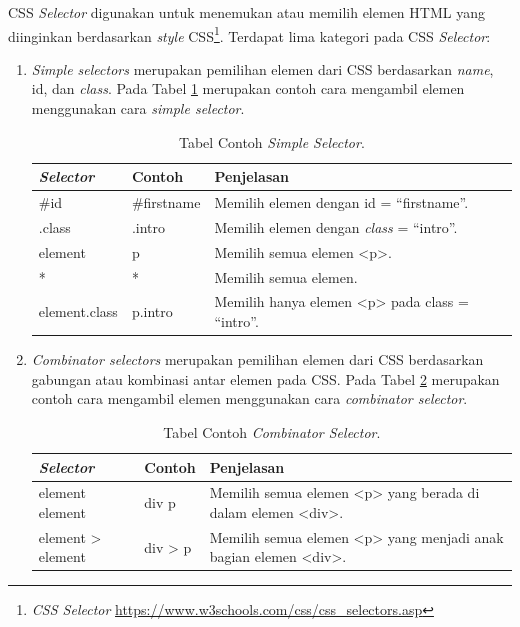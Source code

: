 CSS \textit{Selector} digunakan untuk menemukan atau memilih elemen HTML yang diinginkan berdasarkan \textit{style} CSS\footnote{\textit{CSS Selector} \url{https://www.w3schools.com/css/css_selectors.asp}}. Terdapat lima kategori pada CSS \textit{Selector}:
\begin{enumerate}
	
	\item \textit{Simple selectors} merupakan pemilihan elemen dari CSS berdasarkan \textit{name}, id, dan \textit{class}. Pada Tabel \ref{table:simpel} merupakan contoh cara mengambil elemen menggunakan cara \textit{simple selector}.
	\begin{table}[h!]	\vspace{-0.9cm}
		\centering
		\caption{Tabel Contoh \textit{Simple Selector}.}
		\label{table:simpel}
		\begin{tabular}{ | m{8em} | m{3cm}| m{8cm} | } 
			\hline
			\textit{\textbf{Selector}}& Contoh & Penjelasan \\ 
			\hline
			\#id & 	\#firstname & Memilih elemen dengan id = ``firstname''. \\ 
			\hline
			.class & .intro & Memilih elemen dengan \textit{class} = ``intro''. \\ 
			\hline
			element & p & Memilih semua elemen <p>. \\ 
			\hline
			* & * & Memilih semua elemen.  \\ 
			\hline
			element.class & p.intro & Memilih hanya elemen <p> pada class = ``intro''.  \\ 
			\hline
		\end{tabular}
	\end{table}
	\item \textit{Combinator selectors} merupakan pemilihan elemen dari CSS berdasarkan gabungan atau kombinasi antar elemen pada CSS. Pada Tabel \ref{table:combinator} merupakan contoh cara mengambil elemen menggunakan cara \textit{combinator selector}.
	\begin{table}[h!]	\vspace{-0.4cm}
		\centering
		\caption{Tabel Contoh \textit{Combinator Selector}.}
		\label{table:combinator}
		\begin{tabular}{ | m{9em} | m{2cm}| m{8cm} | } 
			\hline
			\textit{\textbf{Selector}}& Contoh & Penjelasan \\ 
			\hline
			element element & div p & Memilih semua elemen <p> yang berada di dalam elemen <div>. \\ 
			\hline
			element > element & div > p & Memilih semua elemen <p> yang menjadi anak bagian elemen <div>. \\ 

\end{tabular}
\end{table}
\end{enumerate}
